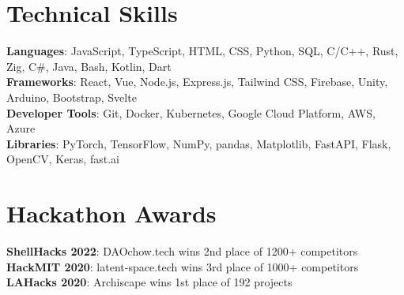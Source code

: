 \documentclass[letterpaper,11pt]{article}
\begin{document}
%
\section{Technical Skills}
\begin{itemize}[leftmargin=0.15in, label={}]
  \small{\item{
        \textbf{Languages}{: JavaScript, TypeScript, HTML, CSS, Python, SQL, C/C++, Rust, Zig, C\#, Java, Bash, Kotlin, Dart} \\
        \textbf{Frameworks}{: React, Vue, Node.js, Express.js, Tailwind CSS, Firebase, Unity, Arduino, Bootstrap, Svelte} \\
        \textbf{Developer Tools}{: Git, Docker, Kubernetes, Google Cloud Platform, AWS, Azure} \\
        \textbf{Libraries}{: PyTorch, TensorFlow, NumPy, pandas, Matplotlib, FastAPI, Flask, OpenCV, Keras, fast.ai} \\
        }}
\end{itemize}


\section{Hackathon Awards}
\begin{itemize}[leftmargin=0.15in, label={}]
  \small{\item{
        \textbf{ShellHacks 2022}{: DAOchow.tech wins 2nd place of 1200+ competitors} \\
        \textbf{HackMIT 2020}{: latent-space.tech wins 3rd place of 1000+ competitors} \\
        \textbf{LAHacks 2020}{: Archiscape wins 1st place of 192 projects} \\
        }}
\end{itemize}
\end{document}
